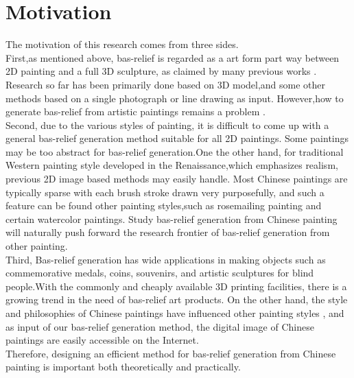 \section{Motivation}
The motivation of this research comes from three sides.\\First,as mentioned above, bas-relief is regarded as a art form part way between 2D painting and a full 3D sculpture, as claimed by many previous works \cite{benzaid2017analysis}\cite{weyrich2007digital}\cite{kerber2009feature}\cite{kerber2012computer}\cite{zeng2014region}. Research so far has been primarily done based on 3D model,and some other methods based on a single photograph or line drawing as input. However,how to generate bas-relief from artistic paintings remains a problem .\\
Second, due to the various styles of painting, it is difficult to come up with a general bas-relief generation method suitable for all 2D paintings. Some paintings may be too abstract for bas-relief generation.One the other hand, for traditional Western painting style developed in the Renaissance,which emphasizes realism\cite{chu2004real}, previous 2D image based methods may easily handle. Most Chinese paintings are typically sparse with each brush stroke drawn very purposefully\cite{smith1997art}, and such a feature can be found other painting styles,such as rosemailing painting and certain watercolor paintings. Study bas-relief generation from Chinese painting will naturally push forward the research frontier of bas-relief generation from other painting. \\
Third, Bas-relief generation has wide applications in making objects such as commemorative medals, coins, souvenirs, and artistic sculptures for blind people.With the commonly and cheaply available 3D printing facilities, there is a growing trend in the need of bas-relief art products. On the other hand, the style and philosophies of Chinese paintings have influenced other painting styles \cite{chu2004real}, and as input of our bas-relief generation method, the digital image of Chinese paintings are easily accessible on the Internet.    \\
Therefore, designing an efficient method for bas-relief generation from Chinese painting is important both theoretically and practically.


